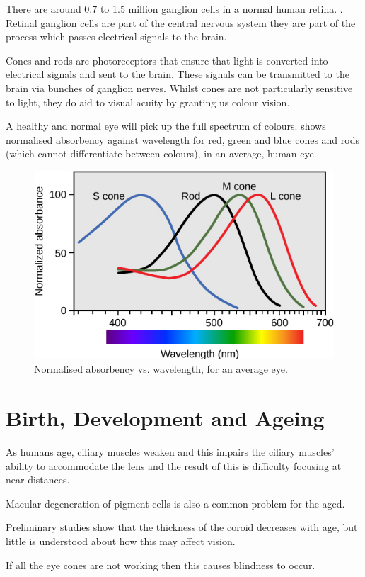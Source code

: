 There are around 0.7 to 1.5 million ganglion cells in a normal human retina.
\cite{curcio1990topography}. Retinal ganglion cells are part of the central
nervous system they are part of the process which passes electrical
signals to the brain.\cite{meyer1995characterization}

Cones and rods are photoreceptors that ensure that light is converted into
electrical signals  and sent to the brain. These signals can
be transmitted to the brain via bunches of ganglion nerves. Whilst cones
are not particularly sensitive to light, they do aid to visual acuity by
granting us colour vision.\cite{}

A healthy and normal eye will pick up the full spectrum of colours.
 shows normalised absorbency against wavelength
for red, green and blue cones and rods (which cannot differentiate
between colours), in an average, human eye.

\begin{figure}[htbp]
  \centering
    \includegraphics{figures/wavelengths}
  \caption{Normalised absorbency vs. wavelength, for an average eye.}
  \label{fig:wavelengths}
\end{figure}

\section{Birth, Development and Ageing}

As humans age, ciliary muscles weaken and this impairs the ciliary
muscles' ability to accommodate the lens and the result of this is
difficulty focusing at near distances.\cite{fisher1985ciliary}

Macular degeneration of pigment cells  is
also a common problem for the aged.

Preliminary studies show that the thickness of the coroid decreases
with age, but little is understood about how this may affect vision.
\cite{margolis2009pilot}

If all the eye cones are not working then this causes blindness
to occur.\cite{}